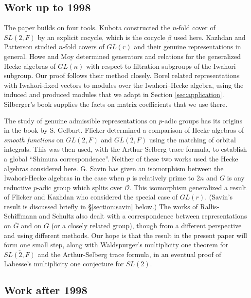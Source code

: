 \documentclass[12pt,letterpaper,reqno]{amsart}
\let\cal\mathcal
\theoremstyle{definition}
\theoremstyle{remark}
\numberwithin{equation}{section}
\begin{document}
\subsection{Work up to 1998}
\label{sec:lit-before}

The paper builds on four tools. Kubota \cite{Ku67} constructed the $n$-fold
cover of $SL(2,F)$ by an explicit cocycle, which is the cocycle $\beta$ used
here. Kazhdan and Patterson \cite{KP84} studied $n$-fold covers of $GL(r)$
and their genuine representations in general. Howe and Moy \cite{HM85}
determined generators and relations for the generalized Hecke algebras of
$GL(n)$ with respect to filtration subgroups of the Iwahori subgroup. Our
proof follows their method closely. Borel \cite{Bo76} related representations
with Iwahori-fixed vectors to modules over the Iwahori--Hecke algebra, using
the induced and produced modules that we adapt in Section
\ref{sec:application}. Silberger's book \cite{Si79} supplies the facts on
matrix coefficients that we use there.

The study of genuine admissible representations on $p$-adic groups has its
origins in the book \cite{Ge76} by S. Gelbart. Flicker \cite{Fl80} determined a
comparison of Hecke algebras of \emph{smooth functions} on $GL(2,F)$ and
$\overline{GL(2,F)}$ using the matching of orbital integrals. This was then
used, with the Arthur-Selberg trace formula, to establish a global ``Shimura
correspondence''. Neither of these two works used the Hecke algebras
considered here. G. Savin \cite{Sa88} has given an isomorphism between the
Iwahori-Hecke algebras in the case when $p$ is relatively prime to $2n$ and
$G$ is any reductive $p$-adic group which splits over ${\cal O}$. This
isomorphism generalized a result of Flicker and Kazhdan \cite{FK86} who
considered the special case of $GL(r)$. (Savin's result is discussed briefly
in \S \ref{section:savin} below.) The works of Rallis-Schiffmann \cite{RS77} and
Schultz \cite{Sc98} also dealt with a correspondence between representations on
$\overline{G}$ and on $G$ (or a closely related group), though from a
different perspective and using different methods. Our hope is that the result
in the present paper will form one small step, along with Waldspurger's
multiplicity one theorem for $\overline{SL(2,F)}$ \cite{Wa80} and the
Arthur-Selberg trace formula, in an eventual proof of Labesse's multiplicity
one conjecture for $SL(2)$.

\subsection{Work after 1998}
\label{sec:lit-after}
\end{document}
